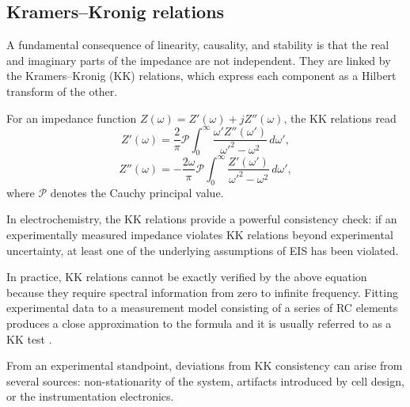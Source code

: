 \subsection{Kramers--Kronig relations}
\label{sec:kk}

A fundamental consequence of linearity, causality, and stability is that the real and imaginary parts of the impedance are not independent. 
They are linked by the Kramers--Kronig (KK) relations, which express each component as a Hilbert transform of the other.

For an impedance function $Z(\omega) = Z'(\omega) + j Z''(\omega)$, the KK relations read
\begin{equation}
    Z'(\omega) = \frac{2}{\pi} \mathcal{P}
    \int_{0}^{\infty}
    \frac{\omega' Z''(\omega')}{\omega'^2 - \omega^2} \, d\omega',
\end{equation}
\begin{equation}
    Z''(\omega) = -\frac{2\omega}{\pi} \mathcal{P}
    \int_{0}^{\infty}
    \frac{Z'(\omega')}{\omega'^2 - \omega^2} \, d\omega',
\end{equation}
where $\mathcal{P}$ denotes the Cauchy principal value.

In electrochemistry, the KK relations provide a powerful consistency check: 
if an experimentally measured impedance violates KK relations beyond experimental uncertainty, at least one of the underlying assumptions of EIS has been violated.

In practice, KK relations cannot be exactly verified by the above equation because they require spectral information from zero to infinite frequency.
Fitting experimental data to a measurement model consisting of a series of RC elements produces a close approximation to the formula and it is usually referred to as a KK test \cite{Boukamp_1995, orazemEIS,SCHONLEBER201420}.

From an experimental standpoint, deviations from KK consistency can arise from several sources: non-stationarity of the system, artifacts introduced by cell design, or the instrumentation electronics.
